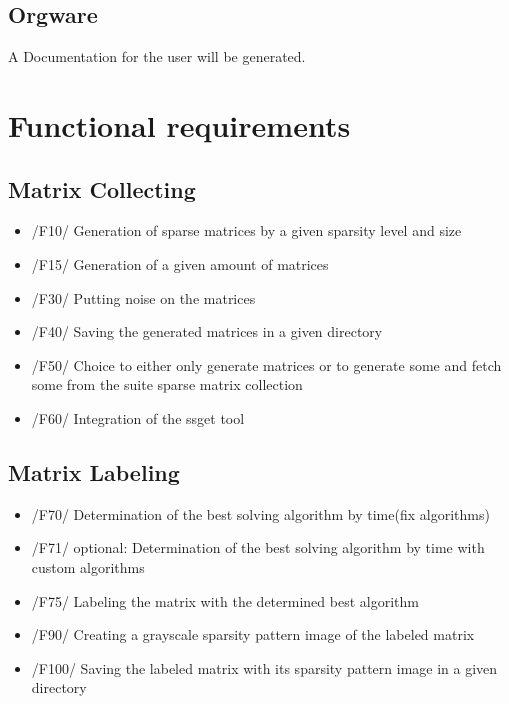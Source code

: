 \documentclass[parskip=full]{scrartcl}
\begin{document}
\subsection{Orgware}
A Documentation for the user will be generated.


\section{Functional requirements}
\subsection{Matrix Collecting}
	\begin{itemize}
	\item /F10/ Generation of sparse matrices by a given sparsity level and size
	\item /F15/ Generation of a given amount of matrices
	\item /F30/ Putting noise on the matrices
 	\item /F40/ Saving the generated matrices in a given directory
        \item /F50/ Choice to either only generate matrices or to generate some and fetch some from the suite sparse matrix collection
	\item /F60/ Integration of the ssget tool
          \end{itemize}
\subsection{Matrix Labeling}
	\begin{itemize}
	\item /F70/ Determination of the best solving algorithm by time(fix algorithms)
	\item /F71/ optional: Determination of the best solving algorithm by time with custom algorithms
	\item /F75/ Labeling the matrix with the determined best algorithm
	\item /F90/ Creating a grayscale sparsity pattern image of the labeled matrix
	\item /F100/ Saving the labeled matrix with its sparsity pattern image in a given directory 
	\end{itemize}
	
	
\end{document}
